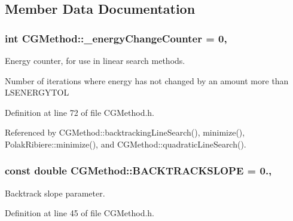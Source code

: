 \subsection{Member Data Documentation}
\hypertarget{classCGMethod_aadb778c988685e46d7d109350973d826}{
\subsubsection[{\+\_\+energy\+Change\+Counter}]{\setlength{\rightskip}{0pt plus 5cm}int C\+G\+Method\+::\+\_\+energy\+Change\+Counter = 0\hspace{0.3cm}{\ttfamily [protected]}, {\ttfamily [inherited]}}}\label{classCGMethod_aadb778c988685e46d7d109350973d826}


Energy counter, for use in linear search methods. 

Number of iterations where energy has not changed by an amount more than L\+S\+E\+N\+E\+R\+G\+Y\+T\+O\+L 

Definition at line 72 of file C\+G\+Method.\+h.



Referenced by C\+G\+Method\+::backtracking\+Line\+Search(), minimize(), Polak\+Ribiere\+::minimize(), and C\+G\+Method\+::quadratic\+Line\+Search().

\hypertarget{classCGMethod_aa7a8cad90cb1961052e323ded645b4c2}{
\subsubsection[{B\+A\+C\+K\+T\+R\+A\+C\+K\+S\+L\+O\+P\+E}]{\setlength{\rightskip}{0pt plus 5cm}const double C\+G\+Method\+::\+B\+A\+C\+K\+T\+R\+A\+C\+K\+S\+L\+O\+P\+E = 0.\hspace{0.3cm}{\ttfamily [protected]}, {\ttfamily [inherited]}}}\label{classCGMethod_aa7a8cad90cb1961052e323ded645b4c2}


Backtrack slope parameter. 



Definition at line 45 of file C\+G\+Method.\+h.



